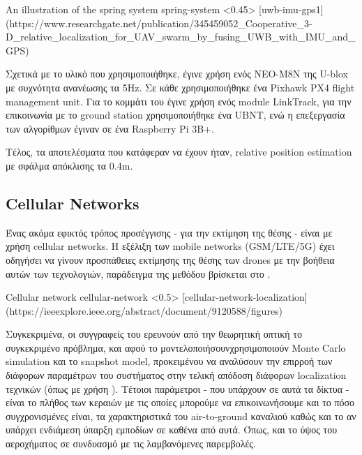{An illustration of the spring system}%
{spring-system}%
<0.45>%
[uwb-imu-gps1]%
(https://www.researchgate.net/publication/345459052_Cooperative_3-D_relative_localization_for_UAV_swarm_by_fusing_UWB_with_IMU_and_GPS)

Σχετικά με το υλικό που χρησιμοποιήθηκε, έγινε χρήση ενός NEO-M8N  της U-blox με συχνότητα ανανέωσης τα 5Hz.  
Σε κάθε  χρησιμοποιήθηκε ένα Pixhawk PX4 flight management unit. Για το κομμάτι του  έγινε χρήση
ενός module LinkTrack, για την επικοινωνία με το ground station χρησιμοποιήθηκε ένα UBNT, ενώ η επεξεργασία των 
αλγορίθμων έγιναν σε ένα Raspberry Pi 3B+. 

Τέλος, τα αποτελέσματα που κατάφεραν να έχουν ήταν,  relative position estimation με σφάλμα απόκλισης τα 0.4m. 

\subsection{Cellular Networks}
Ένας ακόμα εφικτός τρόπος προσέγγισης - για την εκτίμηση της θέσης - είναι με χρήση
cellular networks. Η εξέλιξη των mobile networks (GSM/LTE/5G) έχει οδηγήσει να γίνουν προσπάθειες εκτίμησης
της θέσης των drones με την βοήθεια αυτών των τεχνολογιών, παράδειγμα της μεθόδου βρίσκεται στο . 

{Cellular network}%
{cellular-network}%
<0.5>%
[cellular-network-localization]%
(https://ieeexplore.ieee.org/abstract/document/9120588/figures)

Συγκεκριμένα, οι συγγραφείς του \cite{cellular-network-localization} ερευνούν από την θεωρητική οπτική το συ\-γκε\-κρι\-μένο πρόβλημα, 
και αφού το μοντελοποιήσουν\udot χρησιμοποιούν Monte Carlo simulation και το snapshot model, προκειμένου να αναλύσουν την επιρροή 
των διάφορων παραμέτρων του συστήματος στην τελική απόδοση διάφορων localization τεχνικών (όπως με χρήση ). Τέτοιοι 
παράμετροι - που υπάρχουν σε αυτά τα δίκτυα - είναι το πλήθος των κεραιών με τις οποίες μπορούμε να επικοινωνήσουμε και το πόσο συγχρονισμένες 
είναι, τα χαρακτηριστικά του air-to-ground καναλιού καθώς και το αν υπάρχει ενδιάμεση ύπαρξη εμποδίων σε καθένα από αυτά. Όπως, και το 
ύψος του αεροχήματος σε συνδυασμό με τις λαμβανόμενες παρεμβολές.

